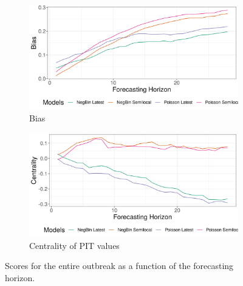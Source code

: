 \begin{figure}[H]
\begin{subfigure}{0.5\textwidth}
  \centering
  \includegraphics[width=\linewidth]{../output/Beni_bias.png}  
  \caption{Bias}
  \label{fig:sub-third}
\end{subfigure}
\begin{subfigure}{0.5\textwidth}
  \centering
  \includegraphics[width=\linewidth]{../output/Beni_centrality.png}  
  \caption{Centrality of PIT values}
  \label{fig:nat_scores_4}
\end{subfigure}
  \caption{Scores for the entire outbreak as a function of the forecasting horizon.}

  \label{fig:nat_scores}
\end{figure}
